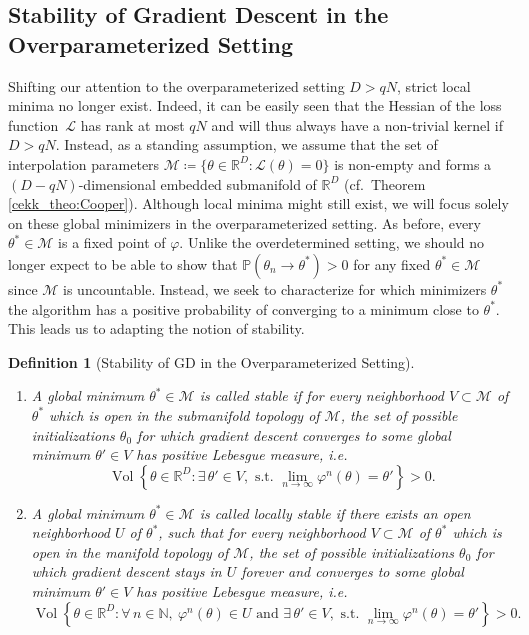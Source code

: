 \documentclass[10pt]{article}
\newcommand{\R}{{\mathbb R}}
\def\R{\mathbb{R}}
\newtheorem{definition}[theorem]{Definition}
\begin{document}
\subsection{Stability of Gradient Descent in the Overparameterized Setting}\textbf{\label{cekk_subs:GDOpar}}
Shifting our attention to the overparameterized setting $D>qN$, strict local minima no longer exist. Indeed, it can be easily seen that the Hessian of the loss function~$\mathcal L$ has rank at most $qN$ and will thus always have a non-trivial kernel if $D>qN.$ Instead, as a standing assumption, we assume that the set of interpolation parameters $\mathcal M \coloneqq \{\theta \in \R^D: \mathcal L(\theta) = 0 \}$ is non-empty and forms a $(D-qN)$-dimensional embedded submanifold of $\R^D$ (cf.~Theorem \ref{cekk_theo:Cooper}). Although local minima might still exist, we will focus solely on these global minimizers in the overparameterized setting. As before, every $\theta^* \in \mathcal M$ is a fixed point of $\varphi$. Unlike the overdetermined setting, we should no longer expect to be able to show that $\mathbb P(\theta_n \to \theta^*) > 0$ for any fixed $\theta^* \in \mathcal M$ since $\mathcal M$ is uncountable. Instead, we seek to characterize for which minimizers $\theta^*$ the algorithm has a positive probability of converging to a minimum close to $\theta^*$. This leads us to adapting the notion of stability.
\begin{definition}[Stability of GD in the Overparameterized Setting]~\label{cekk_def:StabGDOpar}
	\begin{enumerate}
		\item[(i)] A global minimum $\theta^*\in \mathcal M$ is called \emph{stable} if for every neighborhood $V\subset \mathcal M$ of $\theta^*$ which is open in the submanifold topology of $\mathcal M$, the set of possible initializations $\theta_0$ for which gradient descent converges to some global minimum $\theta' \in V$ has positive Lebesgue measure, i.e.
		$$\operatorname{Vol}\left\{\theta \in \R^D :\exists\, \theta' \in V, \text{ s.t. } \lim_{n \to \infty} \varphi^n(\theta) = \theta'\right\}>0.$$
		\item[(ii)] A global minimum $\theta^*\in \mathcal M$ is called \emph{locally stable} if there exists an open neighborhood $U$ of $\theta^*$, such that for every neighborhood $V\subset \mathcal M$ of $\theta^*$ which is open in the manifold topology of $\mathcal M$, the set of possible initializations $\theta_0$ for which gradient descent stays in $U$ forever and converges to some global minimum $\theta' \in V$ has positive Lebesgue measure, i.e.
		$$\operatorname{Vol}\left\{\theta \in \R^D :\forall\, n \in \mathbb N, ~\varphi^n(\theta) \in U \text{ and }\exists\, \theta' \in V, \text{ s.t. } \lim_{n \to \infty} \varphi^n(\theta) = \theta'\right\}>0.$$
	\end{enumerate}
\end{definition}
\end{document}
